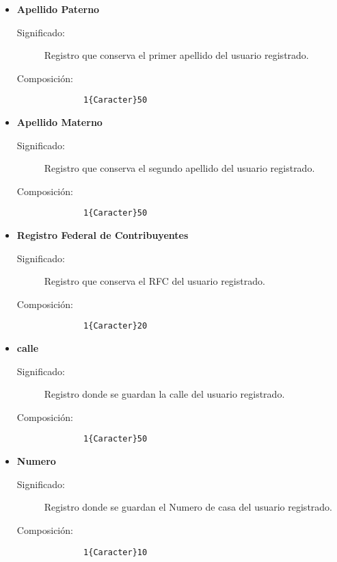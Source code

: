 \begin{itemize}
  \item \textbf{Apellido Paterno}\label{dd:apPatC}
    \begin{description}
      \item [Significado:] Registro que conserva el primer apellido del usuario registrado.
      \item [Composición:]{\begin{lstlisting}
        1{Caracter}50\end{lstlisting}}
    \end{description}

  \item \textbf{Apellido Materno}\label{dd:apMatC}
    \begin{description}
      \item [Significado:] Registro que conserva el segundo apellido del usuario registrado.
      \item [Composición:]{\begin{lstlisting}
        1{Caracter}50\end{lstlisting}}
    \end{description}

    \item \textbf{Registro Federal de Contribuyentes}\label{dd:rfcC}
    \begin{description}
      \item [Significado:] Registro que conserva el RFC del usuario registrado.
      \item [Composición:]{\begin{lstlisting}
        1{Caracter}20\end{lstlisting}}
    \end{description}

      \item \textbf{calle}\label{dd:calleC}
    \begin{description}
      \item [Significado:] Registro donde se guardan la calle del usuario registrado.
      \item [Composición:]{\begin{lstlisting}
        1{Caracter}50\end{lstlisting}}
    \end{description}

  \item \textbf{Numero}\label{dd:noC}
    \begin{description}
      \item [Significado:] Registro donde se guardan el Numero de casa del usuario registrado.
      \item [Composición:]{\begin{lstlisting}
        1{Caracter}10\end{lstlisting}}
    \end{description}


\end{itemize}
